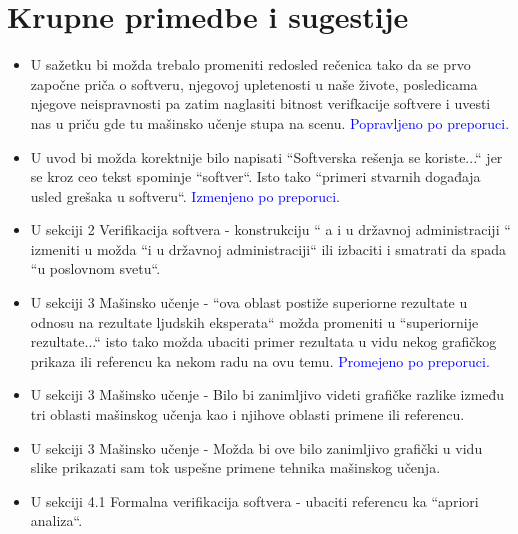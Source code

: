 \documentclass[a4paper]{report}
\newcommand{\odgovor}[1]{\textcolor{blue}{#1}}
\begin{document}
\section{Krupne primedbe i sugestije}
\begin{itemize}
  \item U sažetku bi možda trebalo promeniti redosled rečenica tako da se prvo započne priča o softveru, njegovoj upletenosti u naše živote, posledicama njegove neispravnosti pa zatim naglasiti bitnost verifkacije softvere i uvesti nas u priču gde tu mašinsko učenje stupa na scenu.
  \odgovor{Popravljeno po preporuci.}
  \item U uvod bi možda korektnije bilo napisati ``Softverska rešenja se koriste...`` jer se kroz ceo tekst spominje ``softver``. Isto tako ``primeri stvarnih događaja usled grešaka u softveru``.
  \odgovor{Izmenjeno po preporuci.}
  \item U sekciji 2 Verifikacija softvera - konstrukciju `` a i u državnoj administraciji `` izmeniti u možda ``i u državnoj administraciji`` ili izbaciti i smatrati da spada ``u poslovnom svetu``.
  \item U sekciji 3 Mašinsko učenje - ``ova oblast postiže superiorne rezultate  u odnosu na rezultate ljudskih eksperata`` možda promeniti u ``superiornije rezultate...`` isto tako možda ubaciti primer rezultata u vidu nekog grafičkog prikaza ili referencu ka nekom radu na ovu temu.
  \odgovor{Promejeno po preporuci.}
  \item U sekciji 3 Mašinsko učenje - Bilo bi zanimljivo videti grafičke razlike između tri oblasti mašinskog učenja kao i njihove oblasti primene ili referencu.
  \item U sekciji 3 Mašinsko učenje - Možda bi ove bilo zanimljivo grafički u vidu slike prikazati sam tok uspešne primene tehnika mašinskog učenja.
  \item U sekciji 4.1 Formalna verifikacija softvera - ubaciti referencu ka ``apriori analiza``.
\end{itemize}
\end{document}
